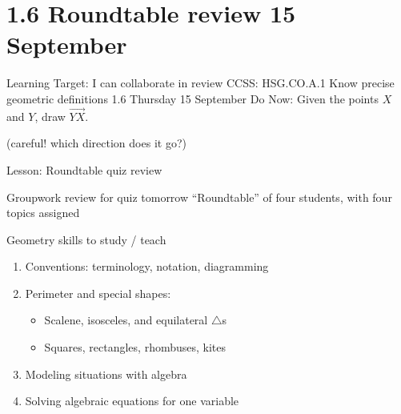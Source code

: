 \section{1.6 Roundtable review \hfill 15 September}
\begin{frame}{Learning Target: I can collaborate in review}
  {CCSS: HSG.CO.A.1 Know precise geometric definitions  \hfill \alert{1.6 Thursday 15 September}}
  Do Now: Given the points $X$ and $Y$, draw $\overrightarrow{YX}$. \par \bigskip
  (careful! which direction does it go?) 
  \vspace{1cm}
  \begin{center}
  \end{center} \vspace{1cm}
  Lesson: Roundtable quiz review
\end{frame}

\begin{frame}{Groupwork review for \alert{quiz tomorrow}}
  {``Roundtable'' of four students, with four topics assigned}
  \begin{block}{Geometry skills to study / teach}
      \begin{enumerate}
    \item Conventions: terminology, notation, diagramming
    \item Perimeter and special shapes: 
    \begin{itemize}
      \item Scalene, isosceles, and equilateral $\triangle$s
      \item Squares, rectangles, rhombuses, kites
    \end{itemize}
    \item Modeling situations with algebra
    \item Solving algebraic equations for one variable
  \end{enumerate}
  \end{block}
\end{frame}

